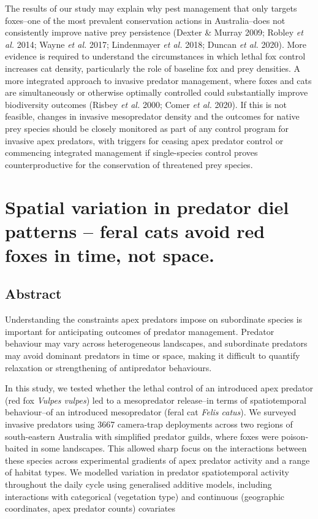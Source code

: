\documentclass[11pt,a4paper,titlepage,twoside,openright]{style/unimelbthesis}
\begin{document}
\begin{mainmatter}
The results of our study may explain why pest management that only targets foxes--one of the most prevalent conservation actions in Australia--does not consistently improve native prey persistence (Dexter \& Murray 2009; Robley \emph{et al.} 2014; Wayne \emph{et al.} 2017; Lindenmayer \emph{et al.} 2018; Duncan \emph{et al.} 2020). More evidence is required to understand the circumstances in which lethal fox control increases cat density, particularly the role of baseline fox and prey densities. A more integrated approach to invasive predator management, where foxes and cats are simultaneously or otherwise optimally controlled could substantially improve biodiversity outcomes (Risbey \emph{et al.} 2000; Comer \emph{et al.} 2020). If this is not feasible, changes in invasive mesopredator density and the outcomes for native prey species should be closely monitored as part of any control program for invasive apex predators, with triggers for ceasing apex predator control or commencing integrated management if single-species control proves counterproductive for the conservation of threatened prey species.

\hypertarget{diel}{%
\chapter{Spatial variation in predator diel patterns -- feral cats avoid red foxes in time, not space.}\label{diel}}

\hypertarget{abstract-3}{%
\section*{Abstract}\label{abstract-3}}

Understanding the constraints apex predators impose on subordinate species is important for anticipating outcomes of predator management. Predator behaviour may vary across heterogeneous landscapes, and subordinate predators may avoid dominant predators in time or space, making it difficult to quantify relaxation or strengthening of antipredator behaviours.

In this study, we tested whether the lethal control of an introduced apex predator (red fox \emph{Vulpes vulpes}) led to a mesopredator release--in terms of spatiotemporal behaviour--of an introduced mesopredator (feral cat \emph{Felis catus}). We surveyed invasive predators using 3667 camera-trap deployments across two regions of south-eastern Australia with simplified predator guilds, where foxes were poison-baited in some landscapes. This allowed sharp focus on the interactions between these species across experimental gradients of apex predator activity and a range of habitat types. We modelled variation in predator spatiotemporal activity throughout the daily cycle using generalised additive models, including interactions with categorical (vegetation type) and continuous (geographic coordinates, apex predator counts) covariates


\end{mainmatter}
\end{document}
